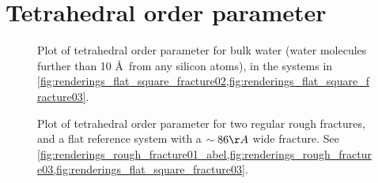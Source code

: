 \section{Tetrahedral order parameter}
%
%
\begin{figure}[htpb]%
    \centering%
    \caption{%
        Plot of tetrahedral order parameter for bulk water (water molecules further than 10 \AA\ from any silicon atoms), in the systems in \cref{fig:renderings_flat_square_fracture02,fig:renderings_flat_square_fracture03}.%
    }%
\end{figure}%
%
\begin{figure}[!p]%
    \centering%
    {
        \captionsetup{width=\textwidth} 
        \caption{%
            Plot of tetrahedral order parameter for two regular rough fractures, and a flat reference system with a $\sim 86 \AA$ wide fracture. See \cref{fig:renderings_rough_fracture01_abel,fig:renderings_rough_fracture03,fig:renderings_flat_square_fracture03}.%
        }%
    }
\end{figure}%
%
